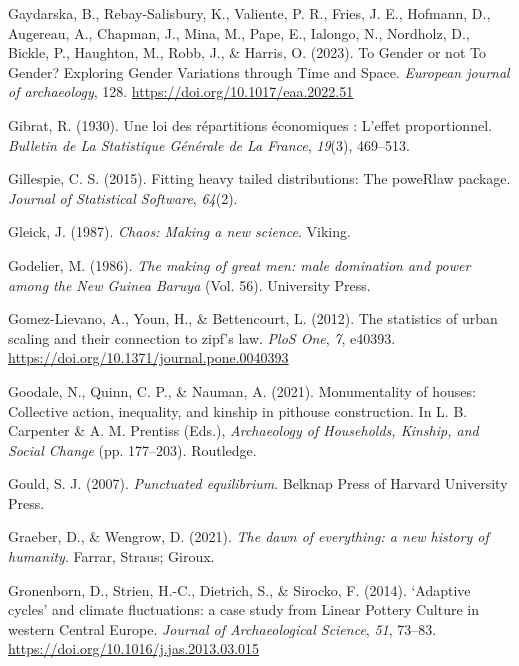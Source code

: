 \documentclass[
  12pt,
]{book}
\newlength{\cslhangindent}
\newlength{\cslentryspacingunit} %
\newenvironment{CSLReferences}[2] %
 {%
  \setlength{\parindent}{0pt}
  \ifodd #1
  \let\oldpar\par
  \def\par{\hangindent=\cslhangindent\oldpar}
  \fi
  \setlength{\parskip}{#2\cslentryspacingunit}
 }%
 {}
\begin{document}
\begin{CSLReferences}{1}{0}
\leavevmode{}%
Gaydarska, B., Rebay-Salisbury, K., Valiente, P. R., Fries, J. E., Hofmann, D., Augereau, A., Chapman, J., Mina, M., Pape, E., Ialongo, N., Nordholz, D., Bickle, P., Haughton, M., Robb, J., \& Harris, O. (2023). To Gender or not To Gender? Exploring Gender Variations through Time and Space. \emph{European journal of archaeology}, 128. \url{https://doi.org/10.1017/eaa.2022.51}

\leavevmode{}%
Gibrat, R. (1930). Une loi des répartitions économiques : L'effet proportionnel. \emph{Bulletin de La Statistique Générale de La France}, \emph{19}(3), 469--513.

\leavevmode{}%
Gillespie, C. S. (2015). Fitting heavy tailed distributions: The poweRlaw package. \emph{Journal of Statistical Software}, \emph{64}(2).

\leavevmode{}%
Gleick, J. (1987). \emph{Chaos: Making a new science}. {Viking}.

\leavevmode{}%
Godelier, M. (1986). \emph{The making of great men: male domination and power among the New Guinea Baruya} (Vol. 56). University Press.

\leavevmode{}%
Gomez-Lievano, A., Youn, H., \& Bettencourt, L. (2012). The statistics of urban scaling and their connection to zipf{'}s law. \emph{PloS One}, \emph{7}, e40393. \url{https://doi.org/10.1371/journal.pone.0040393}

\leavevmode{}%
Goodale, N., Quinn, C. P., \& Nauman, A. (2021). Monumentality of houses: {Collective} action, inequality, and kinship in pithouse construction. In L. B. Carpenter \& A. M. Prentiss (Eds.), \emph{Archaeology of {Households}, {Kinship}, and {Social Change}} (pp. 177--203). {Routledge}.

\leavevmode{}%
Gould, S. J. (2007). \emph{Punctuated equilibrium}. Belknap Press of Harvard University Press.

\leavevmode{}%
Graeber, D., \& Wengrow, D. (2021). \emph{The dawn of everything: a new history of humanity}. Farrar, Straus; Giroux.

\leavevmode{}%
Gronenborn, D., Strien, H.-C., Dietrich, S., \& Sirocko, F. (2014). {`}Adaptive cycles{'} and climate fluctuations: a case study from Linear Pottery Culture in western Central Europe. \emph{Journal of Archaeological Science}, \emph{51}, 73--83. \url{https://doi.org/10.1016/j.jas.2013.03.015}


\end{CSLReferences}
\end{document}
